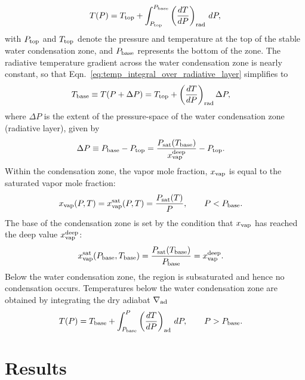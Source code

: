 \documentclass[11pt]{ucscthesisbs}
\begin{document}
\begin{equation}
  T(P) = T_{\rm top} + \int_{P_{\rm top}}^{P_{\rm base}} \left(\frac{dT}{dP}\right)_{\rm rad}\,d P ,
  \label{eq:temp_integral_over_radiative_layer}
\end{equation}
with $P_{\rm top}$ and $T_{\rm top}$ denote the pressure and temperature at the top of the stable water condensation zone, and $P_{\rm base}$ represents the bottom of the zone. The radiative temperature gradient across the water condensation zone is nearly constant, so that Eqn.~\ref{eq:temp_integral_over_radiative_layer} simplifies to
\begin{align}
T_{\rm base}\equiv T(P+\Delta P) &= T_{\rm top} + \left(\frac{dT}{dP}\right)_{\rm rad}\Delta P ,
\label{eq:temperature_profile_over_radiative_layer_simplification}
\end{align}
where $\Delta P$ is the extent of the pressure-space of the water condensation zone (radiative layer), given by
\begin{align}
\Delta P \equiv P_{\rm base}-P_{\rm top} &= \frac{P_{\rm sat}(T_{\rm base})}{x_{\rm vap}^{\rm deep}} - P_{\rm top}.
\label{eq:delta_P_over_radiative_layer}
\end{align}
Within the condensation zone, the vapor mole fraction, $x_{\rm vap}$ is equal to the saturated vapor mole fraction:
\begin{align}
x_{\rm vap}(P, T) &= x_{\rm vap}^{\rm sat}(P, T) = \frac{P_{\rm sat}(T)}{P}, \qquad P<P_{\rm base}.
\label{eq:vapor_mole_fraction_within_condensation_zone}
\end{align}
The base of the condensation zone is set by the condition that $x_{\rm vap}$ has reached the deep value $x_{\rm vap}^{\rm deep}$:
\begin{align}
x_{\rm vap}^{\rm sat}(P_{\rm base}, T_{\rm base}) &= \frac{P_{\rm sat}(T_{\rm base})}{P_{\rm base}}=x_{\rm vap}^{\rm deep}.
\end{align}
Below the water condensation zone, the region is subsaturated and hence no condensation occurs. Temperatures below the water condensation zone are obtained by integrating the dry adiabat $\nabla_{\rm ad}$
\begin{align}
T(P) &= T_{\rm base} + \int_{P_{\rm base}}^P\left(\frac{dT}{dP}\right)_{\rm ad}\,d P, \qquad  P>P_{\rm base} .
\label{eq:dry_adiabat_integration}
\end{align}


\chapter{Results}
\end{document}
